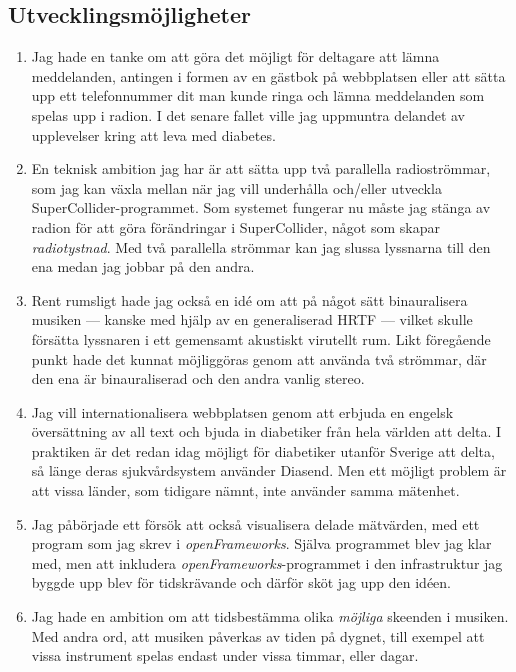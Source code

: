 \documentclass[11pt, a4paper]{article} %
\begin{document}
\subsection*{Utvecklingsmöjligheter}
  \begin{enumerate}
	\item Jag hade en tanke om att göra det möjligt för deltagare att lämna meddelanden, antingen i formen av en gästbok på webbplatsen eller att sätta upp ett telefonnummer dit man kunde ringa och lämna meddelanden som spelas upp i radion. I det senare fallet ville jag uppmuntra delandet av upplevelser kring att leva med diabetes.
	\item En teknisk ambition jag har är att sätta upp två parallella radioströmmar, som jag kan växla mellan när jag vill underhålla och/eller utveckla SuperCollider-programmet. Som systemet fungerar nu måste jag stänga av radion för att göra förändringar i SuperCollider, något som skapar \emph{radiotystnad}. Med två parallella strömmar kan jag slussa lyssnarna till den ena medan jag jobbar på den andra.
	\item Rent rumsligt hade jag också en idé om att på något sätt binauralisera musiken --- kanske med hjälp av en generaliserad HRTF --- vilket skulle försätta lyssnaren i ett gemensamt akustiskt virutellt rum. Likt föregående punkt hade det kunnat möjliggöras genom att använda två strömmar, där den ena är binauraliserad och den andra vanlig stereo.
	\item Jag vill internationalisera webbplatsen genom att erbjuda en engelsk översättning av all text och bjuda in diabetiker från hela världen att delta. I praktiken är det redan idag möjligt för diabetiker utanför Sverige att delta, så länge deras sjukvårdsystem använder Diasend. Men ett möjligt problem är att vissa länder, som tidigare nämnt, inte använder samma mätenhet.
	\item Jag påbörjade ett försök att också visualisera delade mätvärden, med ett program som jag skrev i \emph{openFrameworks}. Själva programmet blev jag klar med, men att inkludera \emph{openFrameworks}-programmet i den infrastruktur jag byggde upp blev för tidskrävande och därför sköt jag upp den idéen. 
	\item Jag hade en ambition om att tidsbestämma olika \emph{möjliga} skeenden i musiken. Med andra ord, att musiken påverkas av tiden på dygnet, till exempel att vissa instrument spelas endast under vissa timmar, eller dagar.
  \end{enumerate}
\end{document}
